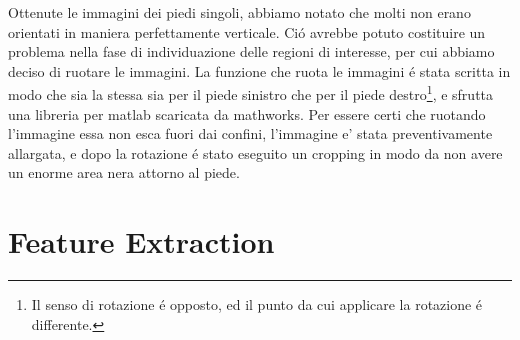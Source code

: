 \documentclass[11pt,twoside,a4paper]{article}
\begin{document}
%

Ottenute le immagini dei piedi singoli, abbiamo notato che molti non erano orientati in maniera perfettamente verticale. Ci\'o avrebbe potuto costituire un problema nella fase di individuazione delle regioni di interesse, per cui abbiamo deciso di ruotare le immagini. La funzione che ruota le immagini \'e stata scritta in modo che sia la stessa sia per il piede sinistro che per il piede destro\footnote{Il senso di rotazione \'e opposto, ed il punto da cui applicare la rotazione \'e differente.}, e sfrutta una libreria per matlab scaricata da mathworks. Per essere certi che ruotando l'immagine essa non esca fuori dai confini, l'immagine e' stata preventivamente allargata, e dopo la rotazione \'e stato eseguito un cropping in modo da non avere un enorme area nera attorno al piede.
\section{Feature Extraction}

\label{sec:implementation}
\end{document}
